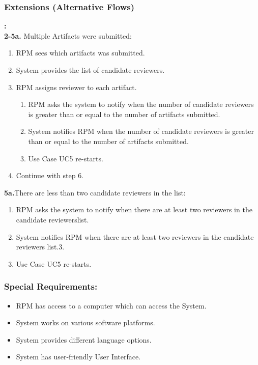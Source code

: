     
    
    
     \subsubsection*{Extensions (Alternative Flows)}\textbf{:}
     \newline
     \\
     \textbf{2-5a.} Multiple Artifacts were submitted:
     \begin{enumerate}
         \itemsep-1em 
        \item RPM sees which artifacts was submitted.
         \item System provides the list of candidate reviewers.
         \item RPM assigns reviewer to each artifact.
         \begin{enumerate}
         \itemsep-1em 
        \item RPM asks the system to notify when the number of candidate reviewers is greater than or equal to the number of artifacts submitted.
         \item System notifies RPM when the number of candidate reviewers is greater than or equal to the number of artifacts submitted.
         \item Use Case UC5 re-starts.
         
    \end{enumerate}
    
    \item Continue with step 6.
         
    \end{enumerate}
    
    
   \textbf{5a.}There are less than two candidate reviewers in the list:
\begin{enumerate}
        \itemsep-1em 
        \item RPM asks the system to notify when there are at least two reviewers in the candidate reviewerslist.
        \item System notifies RPM when there are at least two reviewers in the candidate reviewers list.3.
        \item Use Case UC5 re-starts.
    \end{enumerate}


\subsubsection*{Special Requirements:}
    \begin{itemize}
    \itemsep-1em 
    
    \item RPM has access to a computer which can access the System.
    \item  System works on various software platforms.
    \item  System provides different language options.
    \item System has user-friendly User Interface.
        
    \end{itemize}
     
